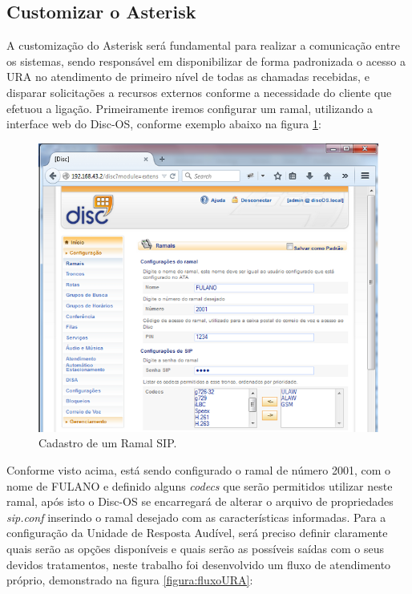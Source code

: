 \subsection{Customizar o Asterisk}

A customização do Asterisk será fundamental para realizar a comunicação entre os sistemas, sendo responsável em disponibilizar de forma padronizada o acesso a URA no atendimento de primeiro nível de todas as chamadas recebidas, e disparar solicitações a recursos externos conforme a necessidade do cliente que efetuou a ligação.
Primeiramente iremos configurar um ramal, utilizando a interface web do Disc-OS, conforme exemplo abaixo na figura \ref{figura:cadastroRamapSIP}:


\begin{figure}[H]
	\centering
	\caption{Cadastro de um Ramal SIP.}	
	\label{figura:cadastroRamapSIP}
	\includegraphics{figuras/cadastro_ramal_sip.png}
\end{figure}


Conforme visto acima, está sendo configurado o ramal de número 2001, com o nome de FULANO e definido alguns \textit{codecs} que serão permitidos utilizar neste ramal, após isto o Disc-OS se encarregará de alterar o arquivo de propriedades \textit{sip.conf} inserindo o ramal desejado com as características informadas.
Para a configuração da Unidade de Resposta Audível, será preciso definir claramente quais serão as opções disponíveis e quais serão as possíveis saídas com o seus devidos tratamentos, neste trabalho foi desenvolvido um fluxo de atendimento próprio, demonstrado na figura \ref{figura:fluxoURA}: 

